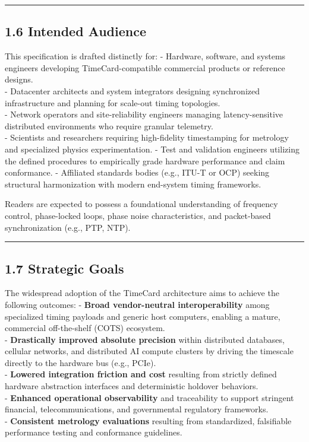 \begin{center}\rule{0.5\linewidth}{0.5pt}\end{center}

\subsection{1.6 Intended Audience}\label{intended-audience}

This specification is drafted distinctly for: - Hardware, software, and
systems engineers developing TimeCard-compatible commercial products or
reference designs.\\
- Datacenter architects and system integrators designing synchronized
infrastructure and planning for scale-out timing topologies.\\
- Network operators and site-reliability engineers managing
latency-sensitive distributed environments who require granular
telemetry.\\
- Scientists and researchers requiring high-fidelity timestamping for
metrology and specialized physics experimentation. - Test and validation
engineers utilizing the defined procedures to empirically grade hardware
performance and claim conformance. - Affiliated standards bodies (e.g.,
ITU-T or OCP) seeking structural harmonization with modern end-system
timing frameworks.

Readers are expected to possess a foundational understanding of
frequency control, phase-locked loops, phase noise characteristics, and
packet-based synchronization (e.g., PTP, NTP).

\begin{center}\rule{0.5\linewidth}{0.5pt}\end{center}

\subsection{1.7 Strategic Goals}\label{strategic-goals}

The widespread adoption of the TimeCard architecture aims to achieve the
following outcomes: - \textbf{Broad vendor-neutral interoperability}
among specialized timing payloads and generic host computers, enabling a
mature, commercial off-the-shelf (COTS) ecosystem.\\
- \textbf{Drastically improved absolute precision} within distributed
databases, cellular networks, and distributed AI compute clusters by
driving the timescale directly to the hardware bus (e.g., PCIe).\\
- \textbf{Lowered integration friction and cost} resulting from strictly
defined hardware abstraction interfaces and deterministic holdover
behaviors.\\
- \textbf{Enhanced operational observability} and traceability to
support stringent financial, telecommunications, and governmental
regulatory frameworks.\\
- \textbf{Consistent metrology evaluations} resulting from standardized,
falsifiable performance testing and conformance guidelines.

